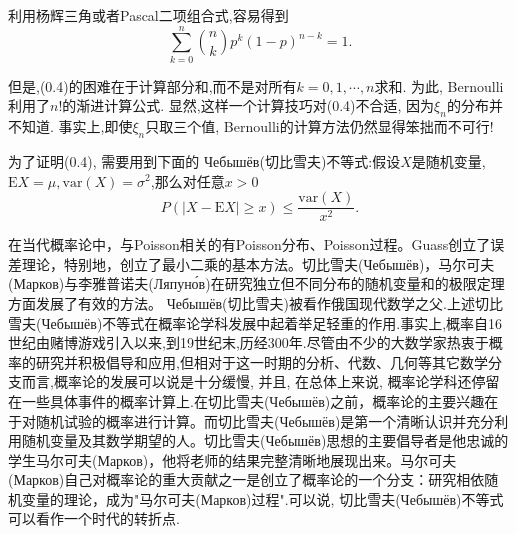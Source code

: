 利用杨辉三角或者Pascal二项组合式,容易得到\begin{equation}
\sum_{k=0}^n\binom{n}{k}p^k(1-p)^{n-k} = 1.	
\end{equation}

但是,(0.4)的困难在于计算部分和,而不是对所有$k=0,1,\cdots,n$求和. 为此, Bernoulli利用了$n!$的渐进计算公式. 显然,这样一个计算技巧对(0.4)不合适, 因为$\xi_n$的分布并不知道. 事实上,即使$\xi_n$只取三个值, Bernoulli的计算方法仍然显得笨拙而不可行!

为了证明(0.4), 需要用到下面的 Чебышёв(切比雪夫)不等式:假设$X$是随机变量, $\mathrm{E}X = \mu,\mathrm{var}(X) = \sigma^2$,那么对任意$x>0$
\begin{equation}
P(|X-\mathrm{E}X|\geqslant x)\leqslant \frac{\mathrm{var}(X)}{x^2}.
\end{equation}

在当代概率论中，与Poisson相关的有Poisson分布、Poisson过程。Guass创立了误差理论，特别地，创立了最小二乘的基本方法。切比雪夫(Чебышёв)，马尔可夫(Марков)与李雅普诺夫(Ляпуно́в)在研究独立但不同分布的随机变量和的极限定理方面发展了有效的方法。
Чебышёв(切比雪夫)被看作俄国现代数学之父.上述切比雪夫(Чебышёв)不等式在概率论学科发展中起着举足轻重的作用.事实上,概率自16世纪由赌博游戏引入以来,到19世纪末,历经300年.尽管由不少的大数学家热衷于概率的研究并积极倡导和应用,但相对于这一时期的分析、代数、几何等其它数学分支而言,概率论的发展可以说是十分缓慢, 并且, 在总体上来说, 概率论学科还停留在一些具体事件的概率计算上.在切比雪夫(Чебышёв)之前，概率论的主要兴趣在于对随机试验的概率进行计算。而切比雪夫(Чебышёв)是第一个清晰认识并充分利用随机变量及其数学期望的人。切比雪夫(Чебышёв)思想的主要倡导者是他忠诚的学生马尔可夫(Марков)，他将老师的结果完整清晰地展现出来。马尔可夫(Марков)自己对概率论的重大贡献之一是创立了概率论的一个分支：研究相依随机变量的理论，成为"马尔可夫(Марков)过程".可以说, 切比雪夫(Чебышёв)不等式可以看作一个时代的转折点.


